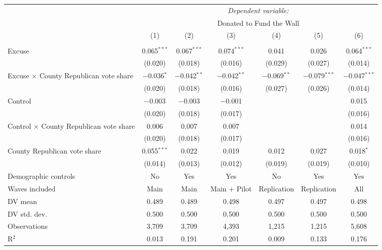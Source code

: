 
\begin{table}[!htbp] \centering 
  \label{t:2-cityheterogeneity} 
\begin{threeparttable}
\begin{tabular}{@{\hspace{5pt}}l@{\hspace{5pt}}cccccc} 
\toprule 
 & \multicolumn{6}{c}{\textit{Dependent variable:}} \\ 
\cmidrule(rr){2-7} 
 & \multicolumn{6}{c}{Donated to Fund the Wall} \\ 
 \cmidrule(rr){2-7}
 & (1) & (2) & (3) & (4) & (5) & (6)\\ 
\midrule  
\\[-2.1ex] Excuse & 0.065$^{***}$ & 0.067$^{***}$ & 0.074$^{***}$ & 0.041 & 0.026 & 0.064$^{***}$ \\ 
  & (0.020) & (0.018) & (0.016) & (0.029) & (0.027) & (0.014) \\ 
 \addlinespace 
 Excuse $\times$ County Republican vote share & $-$0.036$^{*}$ & $-$0.042$^{**}$ & $-$0.042$^{**}$ & $-$0.069$^{**}$ & $-$0.079$^{***}$ & $-$0.047$^{***}$ \\ 
  & (0.020) & (0.018) & (0.016) & (0.027) & (0.026) & (0.014) \\ 
 \addlinespace 
 Control & $-$0.003 & $-$0.003 & $-$0.001 &  &  & 0.015 \\ 
  & (0.020) & (0.018) & (0.017) &  &  & (0.016) \\ 
 \addlinespace 
 Control $\times$ County Republican vote share & 0.006 & 0.007 & 0.007 &  &  & 0.014 \\ 
  & (0.020) & (0.018) & (0.017) &  &  & (0.016) \\ 
 \addlinespace 
 County Republican vote share & 0.055$^{***}$ & 0.022 & 0.019 & 0.012 & 0.027 & 0.018$^{*}$ \\ 
  & (0.014) & (0.013) & (0.012) & (0.019) & (0.019) & (0.010) \\ 
 \addlinespace 
\midrule  
Demographic controls & No & Yes & Yes & No & Yes & Yes \\ 
Waves included & Main & Main & Main + Pilot & Replication & Replication & All \\ 
\midrule
DV mean & 0.489 & 0.489 & 0.498 & 0.497 & 0.497 & 0.498 \\
DV std. dev. & 0.500 & 0.500 & 0.500 & 0.500 & 0.500 & 0.500 \\
Observations & 3,709 & 3,709 & 4,393 & 1,215 & 1,215 & 5,608 \\ 
R$^{2}$ & 0.013 & 0.191 & 0.201 & 0.009 & 0.133 & 0.176 \\ 
\bottomrule 
\end{tabular} 
\end{threeparttable}
\end{table} 
